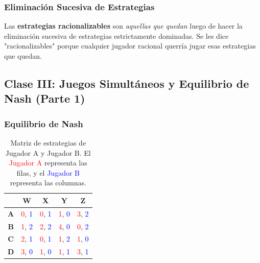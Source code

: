 \documentclass{article}
\begin{document}
            \subsubsection*{Eliminación Sucesiva de Estrategias}
                Las \textbf{estrategias racionalizables} son \emph{aquellas que quedan} luego de hacer la eliminación sucesiva de estrategias estrictamente dominadas. Se les dice "racionalizables" porque cualquier jugador racional querría jugar esas estrategias que quedan.
        \subsection*{Clase III: Juegos Simultáneos y Equilibrio de Nash (Parte 1)}
            \subsubsection*{Equilibrio de Nash}
                \begin{table}[H]
                    \centering
                    \begin{tabular}{|c|c|c|c|c|}
                        \hline
                        & \textbf{W} & \textbf{X} & \textbf{Y} & \textbf{Z} \\ \hline
                        \textbf{A} & \textcolor{red}{0}, \textcolor{blue}{1} & \textcolor{red}{0}, \textcolor{blue}{1} & \textcolor{red}{1}, \textcolor{blue}{0} & \textcolor{red}{3}, \textcolor{blue}{2} \\ \hline
                        \textbf{B} & \textcolor{red}{1}, \textcolor{blue}{2} & \textcolor{red}{2}, \textcolor{blue}{2} & \textcolor{red}{4}, \textcolor{blue}{0} & \textcolor{red}{0}, \textcolor{blue}{2} \\ \hline
                        \textbf{C} & \textcolor{red}{2}, \textcolor{blue}{1} & \textcolor{red}{0}, \textcolor{blue}{1} & \textcolor{red}{1}, \textcolor{blue}{2} & \textcolor{red}{1}, \textcolor{blue}{0} \\ \hline
                        \textbf{D} & \textcolor{red}{3}, \textcolor{blue}{0} & \textcolor{red}{1}, \textcolor{blue}{0} & \textcolor{red}{1}, \textcolor{blue}{1} & \textcolor{red}{3}, \textcolor{blue}{1} \\ \hline
                    \end{tabular}
                    \caption{Matriz de estrategias de Jugador A y Jugador B. El \textcolor{Red}{Jugador A} representa las filas, y el \textcolor{Blue}{Jugador B} representa las columnas.}
                \end{table}
\end{document}
